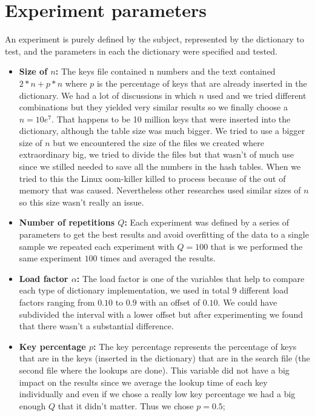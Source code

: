 \documentclass{article}
\begin{document}
    \section{Experiment parameters}
    An experiment is purely defined by the subject, represented by the dictionary to test, and the parameters in each the dictionary were specified and tested. 
    \begin{itemize}
    \item \textbf{Size of $n$:}
            The keys file contained n numbers and the text contained $2 * n + p * n$ where $p$ is the percentage of keys that are already inserted in the dictionary. 
           We had a lot of discussions in which $n$ used and we tried different combinations but they yielded very similar results so we finally choose a $n=10e^7$. 
           That happens to be 10 million keys that were inserted into the dictionary, although the table size was much bigger. We tried to use a bigger size of $n$
           but we encountered the size of the files we created where extraordinary big, we tried to divide the files but that wasn't of much use since we stilled needed to save all the numbers in the hash tables. When we tried to this the Linux oom-killer killed to process because of the out of memory that was caused. Nevertheless other researches \cite{ARTICLE:2} used similar sizes of $n$ so this size wasn't really an issue. 
    \item \textbf{Number of repetitions $Q$:}
               Each experiment was defined by a series of parameters to get the best results and avoid overfitting of the data to a single sample we repeated each experiment with $Q=100$ that is we performed the same experiment $100$ times and averaged the results. 
   
   \item \textbf{Load factor $\alpha$:}
            The load factor is one of the variables that help to compare each type of dictionary implementation, we used in total 
           $9$ different load factors ranging from $0.10$ to $0.9$ with an offset of $0.10$. We could have subdivided the interval with a lower offset but after experimenting we found that there wasn't a substantial difference. 
   \item \textbf{Key percentage $p$:}
          The key percentage represents the percentage of keys that are in the keys (inserted in the dictionary) that are in the search file (the second file where the lookups are done). 
          This variable did not have a big impact on the results since we average the lookup time of each key individually and even if we chose a really low key percentage we had a big enough 
          $Q$ that it didn't matter. Thus we chose $p=0.5$;
          

\end{itemize}
\end{document}
